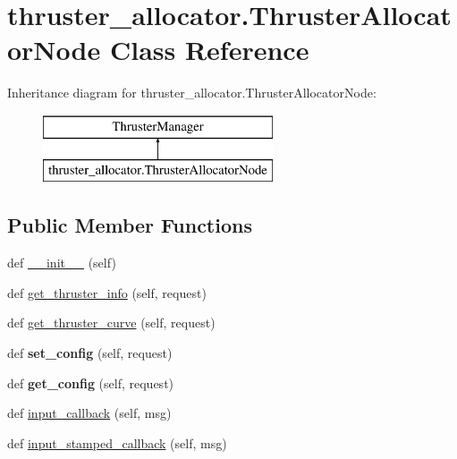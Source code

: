 \hypertarget{classthruster__allocator_1_1ThrusterAllocatorNode}{}\section{thruster\+\_\+allocator.\+Thruster\+Allocator\+Node Class Reference}
\label{classthruster__allocator_1_1ThrusterAllocatorNode}
Inheritance diagram for thruster\+\_\+allocator.\+Thruster\+Allocator\+Node\+:\begin{figure}[H]
\begin{center}
\leavevmode
\includegraphics[height=2.000000cm]{classthruster__allocator_1_1ThrusterAllocatorNode}
\end{center}
\end{figure}
\subsection*{Public Member Functions}
\begin{DoxyCompactItemize}
\item 
def \hyperlink{classthruster__allocator_1_1ThrusterAllocatorNode_a2932029cfc6d72b464473c0e8e639126}{\+\_\+\+\_\+init\+\_\+\+\_\+} (self)
\item 
def \hyperlink{classthruster__allocator_1_1ThrusterAllocatorNode_a134ae0992b5189aaa32c0b40e65b8d6e}{get\+\_\+thruster\+\_\+info} (self, request)
\item 
def \hyperlink{classthruster__allocator_1_1ThrusterAllocatorNode_ab2b4e9ac5ea566077397a09e686639ba}{get\+\_\+thruster\+\_\+curve} (self, request)
\item 
\mbox{\label{classthruster__allocator_1_1ThrusterAllocatorNode_aabdb163abf437cca8f1a8766969401af}} 
def {\bfseries set\+\_\+config} (self, request)
\item 
\mbox{\label{classthruster__allocator_1_1ThrusterAllocatorNode_aed214e13a0a4769a4eb78f64e96a3889}} 
def {\bfseries get\+\_\+config} (self, request)
\item 
def \hyperlink{classthruster__allocator_1_1ThrusterAllocatorNode_a6d28a5f0678df12e4226775f466b3bc4}{input\+\_\+callback} (self, msg)
\item 
def \hyperlink{classthruster__allocator_1_1ThrusterAllocatorNode_ad8da8c9132cddb33f020c62c86ccca3a}{input\+\_\+stamped\+\_\+callback} (self, msg)
\end{DoxyCompactItemize}
